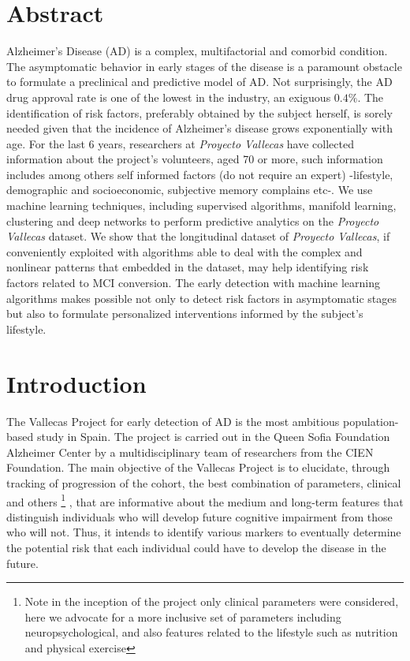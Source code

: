 \documentclass[11pt]{article}
\begin{document}
\section*{Abstract}
Alzheimer's Disease (AD) is a complex, multifactorial and comorbid condition. The asymptomatic behavior in early stages of the disease is a paramount obstacle to formulate a preclinical and predictive model of AD. Not surprisingly, the AD drug approval rate is one of the lowest in the industry, an exiguous $0.4\%$. The identification of risk factors, preferably obtained by the subject herself, is sorely needed given that the incidence of Alzheimer’s disease grows exponentially with age. 
For the last 6 years, researchers at \emph{Proyecto Vallecas} have collected information about the project's volunteers, aged 70 or more, such information includes among others self informed factors (do not require an expert) -lifestyle, demographic and socioeconomic, subjective memory complains etc-. 
We use machine learning techniques, including supervised algorithms, manifold learning, clustering and deep networks to perform predictive analytics on the \emph{Proyecto Vallecas} dataset.
We show that the longitudinal dataset of \emph{Proyecto Vallecas}, if conveniently exploited with algorithms able to deal with the complex and nonlinear patterns that embedded in the dataset, may help identifying risk factors related to MCI conversion.
The early detection with machine learning algorithms makes possible not only to detect risk factors in asymptomatic  stages but also to formulate personalized interventions informed by the subject's lifestyle.

\section{Introduction}
The Vallecas Project for early detection of AD is the most ambitious population-based study in Spain. The project is carried out in the Queen Sofia Foundation Alzheimer Center by a multidisciplinary team of researchers from the CIEN Foundation. The main objective of the Vallecas Project is to elucidate, through tracking of progression of the cohort, the best combination of  parameters, clinical and others \footnote{Note in the inception of the project only clinical parameters were considered, here we advocate for a more inclusive set of parameters including neuropsychological, and also features related to the lifestyle such as nutrition and physical exercise} , that are informative about the medium and long-term features that distinguish individuals who will develop future cognitive impairment from those who will not. Thus, it intends to identify various markers to eventually determine the potential risk that each individual could have to develop the disease in the future.
\end{document}
